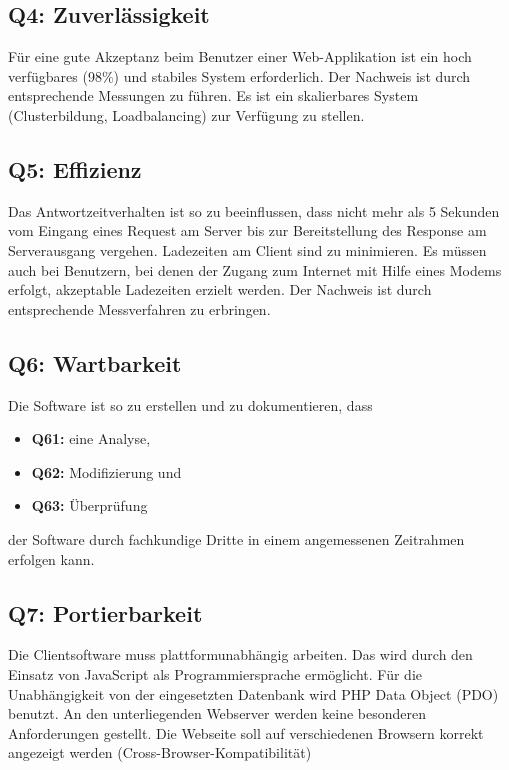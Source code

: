 \documentclass[10pt,a4paper]{scrartcl}
\begin{document}
\subsection{Q4: Zuverlässigkeit}
Für eine gute Akzeptanz beim Benutzer einer Web-Applikation ist ein hoch verfügbares (98$\%$) und stabiles System erforderlich. Der Nachweis ist durch entsprechende Messungen zu führen. Es ist ein skalierbares System (Clusterbildung, Loadbalancing) zur Verfügung zu stellen.


\subsection{Q5: Effizienz}
Das Antwortzeitverhalten ist so zu beeinflussen, dass nicht mehr als 5 Sekunden vom Eingang eines Request am Server bis zur Bereitstellung des Response am Serverausgang vergehen. Ladezeiten am Client sind zu minimieren. Es müssen auch bei Benutzern, bei denen der Zugang zum Internet mit Hilfe eines Modems erfolgt, akzeptable Ladezeiten erzielt werden. Der Nachweis ist durch entsprechende Messverfahren zu erbringen.

\subsection{Q6: Wartbarkeit}

Die Software ist so zu erstellen und zu dokumentieren, dass
\begin{itemize}
\item[] \textbf{Q61:} eine Analyse,
\item[] \textbf{Q62:} Modifizierung und
\item[] \textbf{Q63:} Überprüfung 
\end{itemize}
der Software durch fachkundige Dritte in einem angemessenen Zeitrahmen erfolgen kann.


\subsection{Q7: Portierbarkeit}
Die Clientsoftware muss plattformunabhängig arbeiten. Das wird durch den Einsatz von JavaScript als Programmiersprache ermöglicht. Für die Unabhängigkeit von der eingesetzten Datenbank wird PHP Data Object (PDO) benutzt. An den unterliegenden Webserver werden keine besonderen Anforderungen gestellt. Die Webseite soll auf verschiedenen Browsern korrekt angezeigt werden (Cross-Browser-Kompatibilität)
\end{document}
